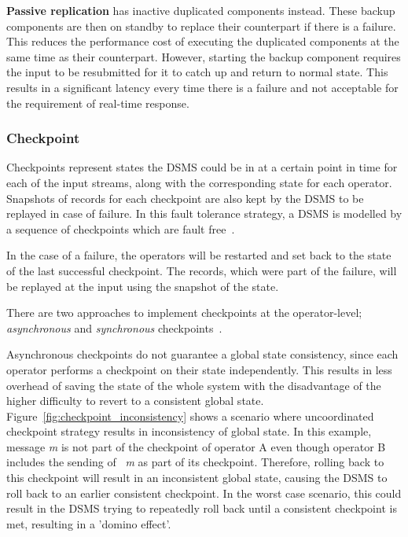 \textbf{Passive replication} has inactive duplicated components instead. These backup
components are then on standby to replace their counterpart if there is a failure. This 
reduces the performance cost of executing the duplicated components at the same 
time as their counterpart. However, starting the backup component requires the input 
to be resubmitted for it to catch up and return to normal state. This results in a significant 
latency every time there is a failure and not acceptable for the requirement of real-time response. 


\subsubsection{Checkpoint}

Checkpoints represent states the DSMS could be in at a certain point in 
time for each of the input streams, along with the corresponding 
state for each operator. Snapshots of records for each checkpoint are also kept 
by the DSMS to be replayed in case of failure. 
In this fault tolerance strategy, a DSMS is modelled by a sequence of 
checkpoints which are fault free~\cite{fault_tolerance_dsms}. 

In the case of a failure, the operators will be restarted and set back to the state of the 
last successful checkpoint. The records, which were part of the failure, will be replayed
at the input using the snapshot of the state. 

There are two approaches to implement checkpoints at the operator-level; 
\emph{asynchronous} and \emph{synchronous} checkpoints~\cite{fault_tolerance_dsms}.

Asynchronous checkpoints do not guarantee a global state consistency, since 
each operator performs a checkpoint on their state independently. This results 
in less overhead of saving the state of the whole system with the disadvantage of the higher 
difficulty to revert to a consistent global state.
Figure~\ref{fig:checkpoint_inconsistency}
shows a scenario where uncoordinated checkpoint strategy results in inconsistency of 
global state. In this example, message \emph{m} is not part of the checkpoint of operator 
A even though operator B includes the sending of ~\emph{m} as part of its checkpoint. Therefore, 
rolling back to this checkpoint will result in an inconsistent global state, causing the 
DSMS to roll back to an earlier consistent checkpoint. In the worst case scenario, this could result 
in the DSMS trying to repeatedly roll back until a consistent checkpoint is met, 
resulting in a 'domino effect'.  

